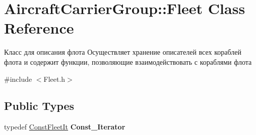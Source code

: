 \hypertarget{class_aircraft_carrier_group_1_1_fleet}{}\section{Aircraft\+Carrier\+Group\+:\+:Fleet Class Reference}
\label{class_aircraft_carrier_group_1_1_fleet}


Класс для описания флота  Осуществляет хранение описателей всех кораблей флота и содержит функции, позволяющие взаимодействовать с кораблями флота  




{\ttfamily \#include $<$Fleet.\+h$>$}

\subsection*{Public Types}
\begin{DoxyCompactItemize}
\item 
\mbox{\label{class_aircraft_carrier_group_1_1_fleet_acf50fa081cc25e4a7a688d47797ccce7}} 
typedef \mbox{\hyperlink{class_aircraft_carrier_group_1_1_const_fleet_it}{Const\+Fleet\+It}} {\bfseries Const\+\_\+\+Iterator}
\end{DoxyCompactItemize}
